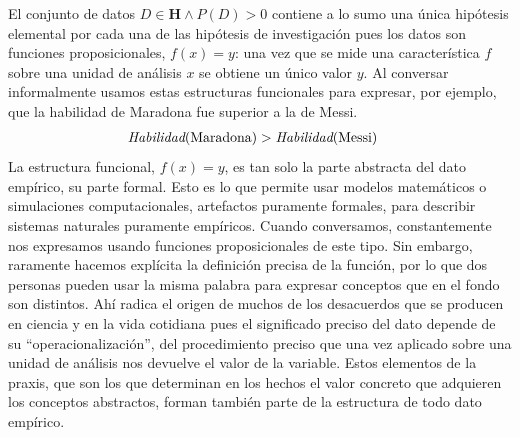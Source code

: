 \documentclass[a4paper,11pt]{book}
\theoremstyle{definition}
\begin{document}
El conjunto de datos $D\in \textbf{H} \land P(D)>0$ contiene a lo sumo una \'unica hip\'otesis elemental por cada una de las hip\'otesis de investigaci\'on pues los datos son funciones proposicionales, $f(x)=y$: una vez que se mide una caracter\'istica $f$ sobre una unidad de an\'alisis $x$ se obtiene un \'unico valor $y$.
%
Al conversar informalmente usamos estas estructuras funcionales para expresar, por ejemplo, que la habilidad de Maradona fue superior a la de Messi.
%
\begin{align*}\label{eq:opiniones}
& \emph{Habilidad}(\text{Maradona}) > \emph{Habilidad}(\text{Messi})
\end{align*}
%
La estructura funcional, $f(x)=y$, es tan solo la parte abstracta del dato emp\'irico, su parte formal.
%
Esto es lo que permite usar modelos matem\'aticos o simulaciones computacionales, artefactos puramente formales, para describir sistemas naturales puramente emp\'iricos.
%
Cuando conversamos, constantemente nos expresamos usando funciones proposicionales de este tipo.
%
Sin embargo, raramente hacemos expl\'icita la definici\'on precisa de la funci\'on, por lo que dos personas pueden usar la misma palabra para expresar conceptos que en el fondo son distintos.
%
Ah\'i radica el origen de muchos de los desacuerdos que se producen en ciencia y en la vida cotidiana pues el significado preciso del dato depende de su ``operacionalizaci\'on'', del procedimiento preciso que una vez aplicado sobre una unidad de an\'alisis nos devuelve el valor de la variable.
%
Estos elementos de la praxis, que son los que determinan en los hechos el valor concreto que adquieren los conceptos abstractos, forman tambi\'en parte de la estructura de todo dato emp\'irico.


\end{document}
